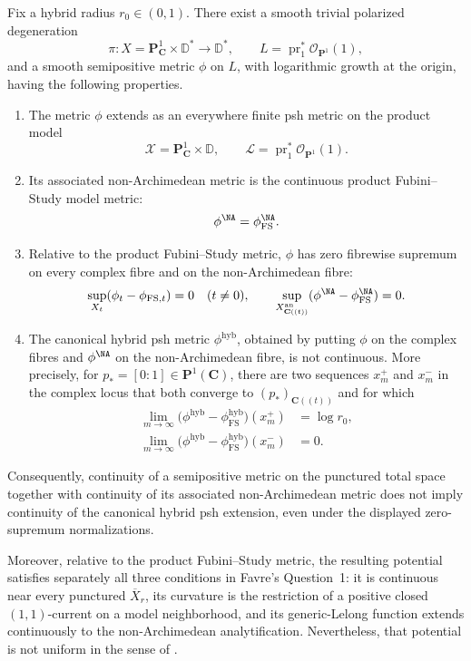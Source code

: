 \begin{theorem}\label{thm:hybrid-endpoint-continuity-counterexample}
Fix a hybrid radius \(r_0\in(0,1)\).  There exist a smooth trivial
polarized degeneration
\[
 \pi\colon X=\mathbf P^1_{\mathbf C}\times\mathbb D^*
       \longrightarrow\mathbb D^*,
 \qquad
 L=\operatorname{pr}_1^*\mathcal O_{\mathbf P^1}(1),
\]
and a smooth semipositive metric \(\phi\) on \(L\), with logarithmic
growth at the origin, having the following properties.
\begin{enumerate}
\item The metric \(\phi\) extends as an everywhere finite psh metric on
the product model
\[
 \mathcal X=\mathbf P^1_{\mathbf C}\times\mathbb D,
 \qquad
 \mathcal L=\operatorname{pr}_1^*\mathcal O_{\mathbf P^1}(1).
\]
\item Its associated non-Archimedean metric is the continuous product
Fubini--Study model metric:
\[
                   \phi^{\NA}
                   =\phi_{\mathrm{FS}}^{\NA}.
\]
\item Relative to the product Fubini--Study metric, \(\phi\) has zero
fibrewise supremum on every complex fibre and on the non-Archimedean
fibre:
\[
 \sup_{X_t}(\phi_t-\phi_{\mathrm{FS},t})=0
 \quad(t\ne0),
 \qquad
 \sup_{X_{\mathbf C((t))}^{\mathrm{an}}}
 (\phi^{\NA}-\phi_{\mathrm{FS}}^{\NA})=0.
\]
\item The canonical hybrid psh metric \(\phi^{\mathrm{hyb}}\), obtained
by putting \(\phi\) on the complex fibres and
\(\phi^{\NA}\) on the non-Archimedean fibre, is not continuous.
More precisely, for \(p_*=[0:1]\in\mathbf P^1(\mathbf C)\), there are
two sequences \(x_m^+\) and \(x_m^-\) in the complex locus that both
converge to \((p_*)_{\mathbf C((t))}\) and for which
\[
\begin{aligned}
 \lim_{m\to\infty}
 \bigl(\phi^{\mathrm{hyb}}
       -\phi_{\mathrm{FS}}^{\mathrm{hyb}}\bigr)(x_m^+)
   &=\log r_0,\\
 \lim_{m\to\infty}
 \bigl(\phi^{\mathrm{hyb}}
       -\phi_{\mathrm{FS}}^{\mathrm{hyb}}\bigr)(x_m^-)
   &=0.
\end{aligned}
\]
\end{enumerate}
Consequently, continuity of a semipositive metric on the punctured total
space together with continuity of its associated non-Archimedean metric
does not imply continuity of the canonical hybrid psh extension, even
under the displayed zero-supremum normalizations.

Moreover, relative to the product Fubini--Study metric, the resulting
potential satisfies separately all three conditions in Favre's
Question~1: it is continuous near every punctured
\(\overline X_r\), its curvature is the restriction of a positive
closed \((1,1)\)-current on a model neighborhood, and its
generic-Lelong function extends continuously to the non-Archimedean
analytification.  Nevertheless, that potential is not uniform in the
sense of \cite[Definition~4.1]{Favre20Hybrid}.
\end{theorem}
